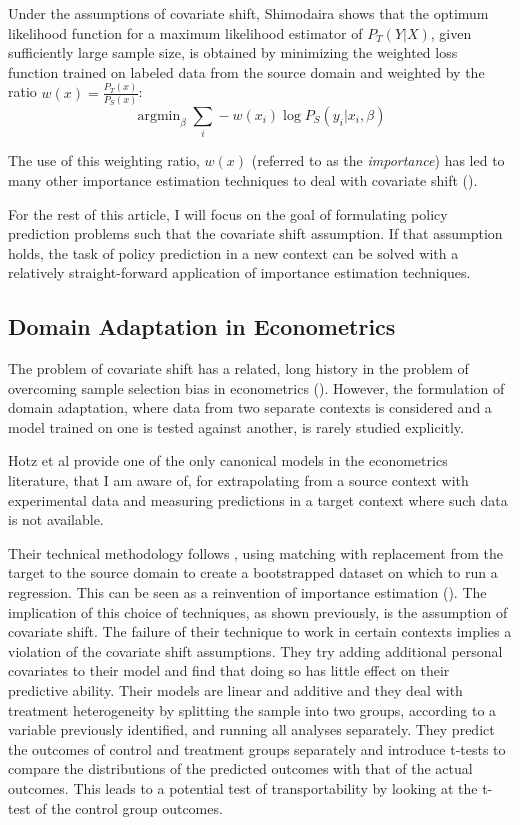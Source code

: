 \documentclass[a4paper,12pt]{article}
\DeclareMathOperator*{\argmin}{argmin}
\begin{document}
Under the assumptions of covariate shift, Shimodaira \parencite*{Shimodaira2000} shows that the optimum likelihood function for a maximum likelihood estimator of $P_T(Y | X)$, given sufficiently large sample size, is obtained by minimizing the weighted loss function trained on labeled data from the source domain and weighted by the ratio $w(x) = \frac{P_T(x)}{P_S(x)}$: 
%
$$
\argmin_{\beta} \sum_i -w(x_i) \log P_S(y_i | x_i, \beta)
$$

The use of this weighting ratio, $w(x)$ (referred to as the \textit{importance}) has led to many other importance estimation techniques to deal with covariate shift (\cite{foo}). 

For the rest of this article, I will focus on the goal of formulating policy prediction problems such that the covariate shift assumption. If that assumption holds, the task of policy prediction in a new context can be solved with a relatively straight-forward application of importance estimation techniques.

\subsection{ Domain Adaptation in Econometrics }

The problem of covariate shift has a related, long history in the problem of overcoming sample selection bias in econometrics (\cite{Manski1977}). However, the formulation of domain adaptation, where data from two separate contexts is considered and a model trained on one is tested against another, is rarely studied explicitly. 

Hotz et al \parencite*{Hotz2005} provide one of the only canonical models in the econometrics literature, that I am aware of, for extrapolating from a source context with experimental data and measuring predictions in a target context where such data is not available. 

Their technical methodology follows \cite{Abadie2006}, using matching with replacement from the target to the source domain to create a bootstrapped dataset on which to run a regression. This can be seen as a reinvention of importance estimation (\cite{Shimodaira2000, Suigyama2007}). The implication of this choice of techniques, as shown previously, is the assumption of covariate shift. The failure of their technique to work in certain contexts implies a violation of the covariate shift assumptions. They try adding additional personal covariates to their model and find that doing so has little effect on their predictive ability. Their models are linear and additive and they deal with treatment heterogeneity by splitting the sample into two groups, according to a variable previously identified, and running all analyses separately. They predict the outcomes of control and treatment groups separately and introduce t-tests to compare the distributions of the predicted outcomes with that of the actual outcomes. This leads to a potential test of transportability by looking at the t-test of the control group outcomes. 
\end{document}
